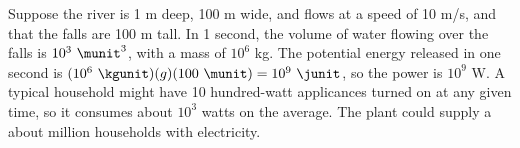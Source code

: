 Suppose the river is 1 m deep, 100 m wide, and flows
at a speed of 10 m/s, and that the falls are 100 m tall.
In 1 second, the volume of water flowing over the falls is
$10^3\ \munit^3$, with a mass of $10^6$  kg. The potential energy
released in one second is $(10^6\ \kgunit)(g)(100\ \munit)=10^9\ \junit$, so the
power is $10^9$ W. A typical household might have 10
hundred-watt applicances turned on at any given time, so it
consumes about $10^3$  watts on the average. The plant could
supply a about million households with electricity.



